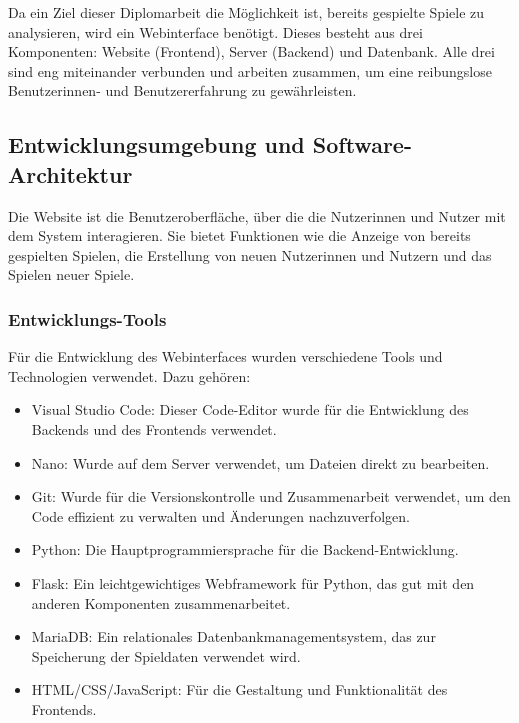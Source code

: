 \renewcommand{\myauthor}{Christina Seidner}

Da ein Ziel dieser Diplomarbeit die Möglichkeit ist, bereits gespielte Spiele zu analysieren, 
wird ein Webinterface benötigt. Dieses besteht aus drei Komponenten: Website (Frontend), 
Server (Backend) und Datenbank. Alle drei sind eng miteinander verbunden und arbeiten 
zusammen, um eine reibungslose  Benutzerinnen- und Benutzererfahrung zu gewährleisten.

\subsection{Entwicklungsumgebung und Software-Architektur}
Die Website ist die Benutzeroberfläche, über die die Nutzerinnen und Nutzer mit dem 
System interagieren. Sie bietet Funktionen wie die Anzeige von bereits gespielten Spielen, 
die Erstellung von neuen Nutzerinnen und Nutzern und das Spielen neuer Spiele. 

\subsubsection{Entwicklungs-Tools}
Für die Entwicklung des Webinterfaces wurden verschiedene Tools und Technologien verwendet. 
Dazu gehören:
\begin{itemize}
    \item Visual Studio Code: Dieser Code-Editor wurde für die Entwicklung des Backends und 
    des Frontends verwendet. 
    \item Nano: Wurde auf dem Server verwendet, um Dateien direkt zu bearbeiten.
    \item Git: Wurde für die Versionskontrolle und Zusammenarbeit verwendet, um den Code 
    effizient zu verwalten und Änderungen nachzuverfolgen.
    \item Python: Die Hauptprogrammiersprache für die Backend-Entwicklung.
    \item Flask: Ein leichtgewichtiges Webframework für Python, das gut mit den anderen 
    Komponenten zusammenarbeitet.
    \item MariaDB: Ein relationales Datenbankmanagementsystem, das zur Speicherung der 
    Spieldaten verwendet wird.
    \item HTML/CSS/JavaScript: Für die Gestaltung und Funktionalität des Frontends.
\end{itemize}


